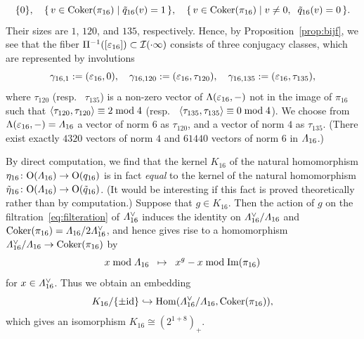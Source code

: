\documentclass{amsart} %
\begin{document}
\[
\{0\},\quad 
\{\,{v \in\operatorname{Coker} (\pi_{16}) }\mid {\tilde{q}_{16}(v)=1} \,\},
\quad
\{\,{v \in\operatorname{Coker} (\pi_{16}) }\mid {v\ne 0, \;\; \tilde{q}_{16}(v)=0} \,\}.
\]
Their sizes are $1$, $120$, and $135$, respectively.
Hence, by Proposition~\ref{prop:bijf}, 
 we see that the fiber $\Pi^{-1} ([\varepsilon_{16}])\subset \mathord{\mathcal{I}}(\cdot \infty)$ consists of three conjugacy classes,
 which are 
 represented by involutions
 \[
 \gamma_{16, 1}:=(\varepsilon_{16}, 0),
 \quad
 \gamma_{16, 120}:=(\varepsilon_{16}, \tau_{120}),
 \quad
 \gamma_{16, 135}:=(\varepsilon_{16}, \tau_{135}),
 \]
where $ \tau_{120}$ (resp. ~$\tau_{135}$) is a non-zero vector of $\Lambda(\varepsilon_{16}, -)$ 
not in the image of $\pi_{16}$ 
such that
$\langle  \tau_{120}, \tau_{120} \rangle\equiv 2 \bmod 4$
 (resp. ~$\langle  \tau_{135}, \tau_{135} \rangle\equiv 0 \bmod 4$).
 We choose from $\Lambda(\varepsilon_{16}, -)=\varLambda_{16}$ a vector of norm $6$ as $\tau_{120}$,
 and a vector of norm $4$ as $\tau_{135}$.
%
(There exist exactly $4320$ vectors of norm $4$ 
and $61440$ vectors of norm $6$ 
in $\varLambda_{16}$.)
%
\begin{remark}\label{remK16}
By direct computation, 
we find that 
the kernel $K_{16}$ of the natural homomorphism $\eta_{16}\colon\mathord{\mathrm{O}}(\varLambda_{16})\to \mathord{\mathrm{O}}(q_{16})$
is in fact \emph{equal} to the kernel of the natural homomorphism 
$\tilde{\eta}_{16}\colon \mathord{\mathrm{O}}(\varLambda_{16})\to \mathord{\mathrm{O}}(\tilde{q}_{16})$.
(It would be interesting if this fact is proved theoretically rather than by computation.)
Suppose that $g\in K_{16}$.
Then 
the action of $g$ on
the filtration~\eqref{eq:filteration} of $\varLambda_{16}^{\vee}$
induces the identity on 
 $\varLambda_{16}^{\vee}/\varLambda_{16}$ and $\operatorname{Coker} (\pi_{16})=\varLambda_{16}/2\varLambda_{16}^{\vee}$, 
and hence gives rise to a homomorphism $\varLambda_{16}^{\vee}/\varLambda_{16}\to \operatorname{Coker} (\pi_{16})$
by 
\[ x \bmod \varLambda_{16} \;\;\mapsto \;\; x^g- x \bmod \operatorname{Im}(\pi_{16})
\]
for $x\in \varLambda_{16}^{\vee}$.
Thus we obtain an embedding
\[
K_{16}/\{\pm \mathord{\mathrm{id}}\}\hookrightarrow \operatorname{Hom}(\varLambda_{16}^{\vee}/\varLambda_{16}, \operatorname{Coker} (\pi_{16})), 
\]
which gives an isomorphism $K_{16}\cong (2^{1+8})_{+}$.
\end{remark}
%
%
\end{document}

